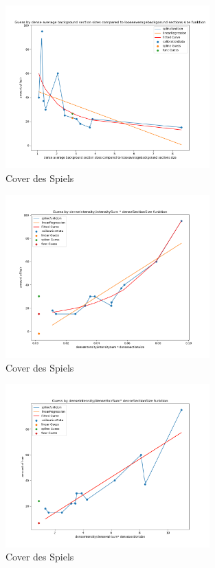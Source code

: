 \documentclass[german,a4paper, 12pt]{scrartcl}
\begin{document}
\begin{figure}
	\centering
	\includegraphics[width=0.7\textwidth]{fig64/g10_denseavgbackgroundsizeVSlooseavg.png}
	\caption[]{Cover des Spiels}
	\label{img:cover}
\end{figure}
\begin{figure}
	\centering
	\includegraphics[width=0.7\textwidth]{fig64/g11_denseIntensitynorm.png}
	\caption[]{Cover des Spiels}
	\label{img:cover}
\end{figure}
\begin{figure}
	\centering
	\includegraphics[width=0.7\textwidth]{fig64/g12_denseIntensitynorm2.png}
	\caption[]{Cover des Spiels}
	\label{img:cover}
\end{figure}
\end{document}
